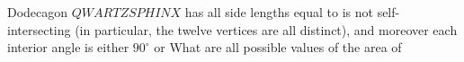 Dodecagon $QWARTZSPHINX$ has all side lengths equal to  is not self-intersecting (in particular, the twelve vertices are all distinct), and moreover each interior angle is either $90^{\circ}$ or  What are all possible values of the area of 
